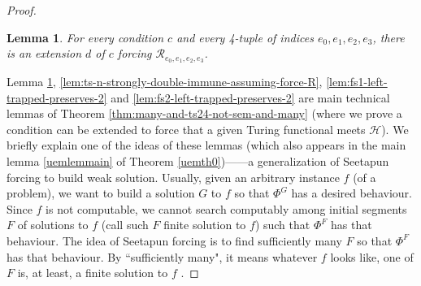 \documentclass{amsart}
\newtheorem{lemma}[theorem]{Lemma}
\theoremstyle{definition}
\theoremstyle{remark}
\numberwithin{equation}{section}
\theoremstyle{noparens}
\def\mcal{\mathcal}
\newcommand{\Rcal}{\mathcal{R}}
\begin{document}
\begin{proof}
\begin{lemma}\label{lem:ts14-strong-preserve-double-immunity-force-Q}
For every condition $c$ and every 4-tuple of indices $e_0, e_1, e_2, e_3$,
there is an extension $d$ of $c$ forcing $\Rcal_{e_0, e_1, e_2, e_3}$.
\end{lemma}
Lemma \ref{lem:ts14-strong-preserve-double-immunity-force-Q},
\ref{lem:ts-n-strongly-double-immune-assuming-force-R},
\ref{lem:fs1-left-trapped-preserves-2}
and
\ref{lem:fs2-left-trapped-preserves-2}
 are main technical lemmas of Theorem \ref{thm:many-and-ts24-not-sem-and-many}
 (where we prove a condition can be extended to force that a given Turing functional meets $\mcal{H}$).
 We briefly explain one of the ideas of these lemmas
 (which also appears in the main lemma \ref{uemlemmain} of Theorem \ref{uemth0})——a generalization of
 Seetapun forcing to build weak solution.
 Usually, given an arbitrary instance $f$ (of a problem),
 we want to build a solution  $G$ to $f$ so that $\Phi^G$ has  a desired behaviour.
Since $f$ is not computable, we cannot search computably among initial segments $F$ of solutions to $f$
(call such $F$ finite solution to $f$)
such that $\Phi^F$ has that behaviour.
The idea of Seetapun forcing is to find sufficiently many $F$
so that $\Phi^F$ has that behaviour. By ``sufficiently many", it means whatever $f$ looks like,
one of $F$ is, at least, a finite solution to $f$ .


\end{proof}
\end{document}
